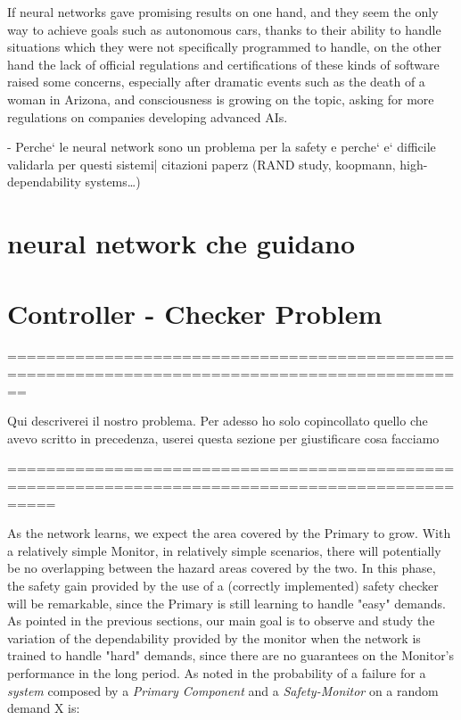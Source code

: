If neural networks gave promising results on one hand, and they seem the only way to achieve goals such as autonomous cars, thanks to their ability to handle situations which they were not specifically programmed to handle, on the other hand the lack of official regulations and certifications of these kinds of software raised some concerns, especially after dramatic events such as the death of a woman in Arizona\cite{arizuber}, and consciousness is growing on the topic, asking for more regulations on companies developing advanced AIs\cite{elonmusk}.





- Perche` le neural network sono un problema per la safety e perche` e` difficile validarla per questi sistemi| citazioni paperz (RAND study, koopmann, high-dependability systems\dots)


\section{neural network che guidano}


\section{Controller - Checker Problem}

==============================================================================================

Qui descriverei il nostro problema. Per adesso ho solo copincollato quello che avevo scritto in precedenza, userei questa sezione per giustificare cosa facciamo

=================================================================================================


As the network learns, we expect the area covered by the Primary to grow. With a relatively simple Monitor, in relatively simple scenarios, there will potentially be no overlapping between the hazard areas covered by the two. In this phase, the safety gain provided by the use of a (correctly implemented) safety checker will be remarkable, since the Primary is still learning to handle "easy" demands. As pointed in the previous sections, our main goal is to observe and study the variation of the dependability provided by the monitor when the network is trained to handle "hard" demands, since there are no guarantees on the Monitor's performance in the long period.\newline
As noted in \cite{striginiPopov} the probability of a failure for a \textsl{system} composed by a \textsl{Primary Component} and a \textsl{Safety-Monitor} on a random demand X is:

